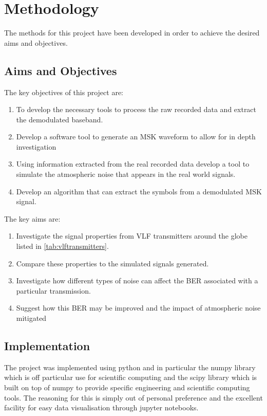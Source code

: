 \chapter{Methodology}
The methods for this project have been developed in order to achieve the desired aims and objectives.

\section{Aims and Objectives}

The key objectives of this project are:

\begin{enumerate}
    \item To develop the necessary tools to process the raw recorded data and extract the demodulated baseband.
    \item Develop a software tool to generate an MSK waveform to allow for in depth investigation
    \item Using information extracted from the real recorded data develop a tool to simulate the atmospheric noise that appears in the real world signals.
    \item Develop an algorithm that can extract the symbols from a demodulated MSK signal.
\end{enumerate}

The key aims are:

\begin{enumerate}
    \item Investigate the signal properties from VLF transmitters around the globe listed in \ref{tab:vlftransmitters}. 
    \item Compare these properties to the simulated signals generated.
    \item Investigate how different types of noise can affect the BER associated with a particular transmission.
    \item Suggest how this BER may be improved and the impact of atmospheric noise mitigated
\end{enumerate}

\section{Implementation}
The project was implemented using python and in particular the numpy library which is off particular use for scientific computing and the scipy library which is built on top of numpy to provide specific engineering and scientific computing tools. The reasoning for this is simply out of personal preference and the excellent facility for easy data visualisation through jupyter notebooks. 

